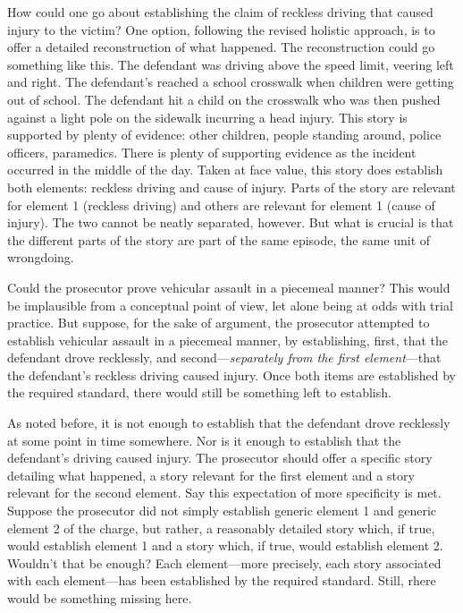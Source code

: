 \documentclass[
  10pt,
  dvipsnames,enabledeprecatedfontcommands]{scrartcl}
\begin{document}
How could one go about establishing the claim of reckless driving that
caused injury to the victim? One option, following the revised holistic
approach, is to offer a detailed reconstruction of what happened. The
reconstruction could go something like this. The defendant was driving
above the speed limit, veering left and right. The defendant's reached a
school crosswalk when children were getting out of school. The defendant
hit a child on the crosswalk who was then pushed against a light pole on
the sidewalk incurring a head injury. This story is supported by plenty
of evidence: other children, people standing around, police officers,
paramedics. There is plenty of supporting evidence as the incident
occurred in the middle of the day. Taken at face value, this story does
establish both elements: reckless driving and cause of injury. Parts of
the story are relevant for element 1 (reckless driving) and others are
relevant for element 1 (cause of injury). The two cannot be neatly
separated, however. But what is crucial is that the different parts of
the story are part of the same episode, the same unit of wrongdoing.

Could the prosecutor prove vehicular assault in a piecemeal manner? This
would be implausible from a conceptual point of view, let alone being at
odds with trial practice. But suppose, for the sake of argument, the
prosecutor attempted to establish vehicular assault in a piecemeal
manner, by establishing, first, that the defendant drove recklessly, and
second---\emph{separately from the first element}---that the defendant's
reckless driving caused injury. Once both items are established by the
required standard, there would still be something left to establish.

As noted before, it is not enough to establish that the defendant drove
recklessly at some point in time somewhere. Nor is it enough to
establish that the defendant's driving caused injury. The prosecutor
should offer a specific story detailing what happened, a story relevant
for the first element and a story relevant for the second element. Say
this expectation of more specificity is met. Suppose the prosecutor did
not simply establish generic element 1 and generic element 2 of the
charge, but rather, a reasonably detailed story which, if true, would
establish element 1 and a story which, if true, would establish element
2. Wouldn't that be enough? Each element---more precisely, each story
associated with each element---has been established by the required
standard. Still, rhere would be something missing here.
\end{document}
